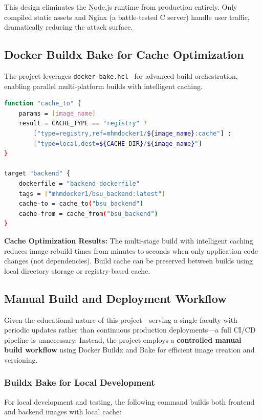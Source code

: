 This design eliminates the Node.js runtime from production entirely. Only compiled static assets and Nginx (a battle-tested C server) handle user traffic, dramatically reducing the attack surface.

\subsection{Docker Buildx Bake for Cache Optimization}

The project leverages \texttt{docker-bake.hcl}~\cite{docker} for advanced build orchestration, enabling parallel multi-platform builds with intelligent caching.

\begin{lstlisting}[language=bash, caption=Docker Buildx Bake Configuration (\texttt{docker-bake.hcl})]
function "cache_to" {
    params = [image_name]
    result = CACHE_TYPE == "registry" ? 
        ["type=registry,ref=mhmdocker1/${image_name}:cache"] : 
        ["type=local,dest=${CACHE_DIR}/${image_name}"]
}

target "backend" {
    dockerfile = "backend-dockerfile"
    tags = ["mhmdocker1/bsu_backend:latest"]
    cache-to = cache_to("bsu_backend")
    cache-from = cache_from("bsu_backend")
}
\end{lstlisting}

\textbf{Cache Optimization Results:} The multi-stage build with intelligent caching reduces image rebuild times from minutes to seconds when only application code changes (not dependencies). Build cache can be preserved between builds using local directory storage or registry-based cache.

\subsection{Manual Build and Deployment Workflow}

Given the educational nature of this project---serving a single faculty with periodic updates rather than continuous production deployments---a full CI/CD pipeline is unnecessary. Instead, the project employs a \textbf{controlled manual build workflow} using Docker Buildx and Bake for efficient image creation and versioning.

\subsubsection{Buildx Bake for Local Development}

For local development and testing, the following command builds both frontend and backend images with local cache:

